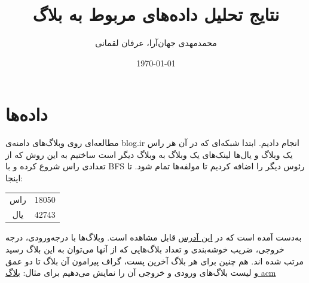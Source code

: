 \documentclass[11pt]{article}
\title{\textbf{نتایج تحلیل داده‌های مربوط به بلاگ}}
\author{محمدمهدی جهان‌آرا، عرفان لقمانی}
\date{\today}
\begin{document}
\maketitle

\section{داده‌ها}
مطالعه‌ای روی وبلاگ‌های دامنه‌ی blog.ir انجام دادیم. ابتدا شبکه‌ای که در آن هر راس یک وبلاگ و یال‌ها لینک‌‌های یک وبلاگ به وبلاگ دیگر است ساختیم به این روش که از تعدادی راس شروع کرده و با BFS رئوس دیگر را اضافه کردیم تا مولفه‌ها تمام شود.
تا اینجا:
\begin{center}
\begin{tabular}{|c|c|}
\hline
راس & 18050 \\
یال & 42743 \\
\hline
\end{tabular}
\end{center}
به‌دست آمده است که در
\href{http://198.143.180.155/blog}{این آدرس}
قابل مشاهده است. وبلاگ‌ها با درجه‌ورودی، درجه خروجی، ضریب خوشه‌بندی و تعداد بلاگ‌هایی که از آنها می‌توان به این بلاگ رسید مرتب شده اند.
هم چنین برای هر بلاگ آخرین پست، گراف پیرامون آن بلاگ تا دو عمق و لیست بلاگ‌های ورودی و خروجی آن را نمایش می‌دهیم برای مثال:
\href{http://198.143.180.155/blog/blog/acm}{بلاگ acm}
\end{document}
